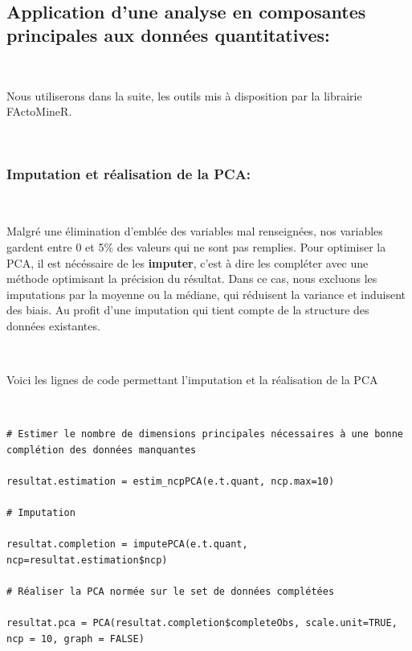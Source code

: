 \documentclass[]{imsart}
\numberwithin{equation}{section}
\theoremstyle{plain}
\begin{document}
~

\hypertarget{application-dune-analyse-en-composantes-principales-aux-donnuxe9es-quantitatives}{%
\subsection{Application d'une analyse en composantes principales aux données quantitatives:}\label{application-dune-analyse-en-composantes-principales-aux-donnuxe9es-quantitatives}}

~

Nous utiliserons dans la suite, les outils mis à disposition par la librairie FActoMineR.

~

\hypertarget{imputation-et-ruxe9alisation-de-la-pca}{%
\subsubsection{Imputation et réalisation de la PCA:}\label{imputation-et-ruxe9alisation-de-la-pca}}

~

Malgré une élimination d'emblée des variables mal renseignées, nos variables gardent entre 0 et 5\% des valeurs qui ne sont pas remplies. Pour optimiser la PCA, il est nécéssaire de les \textbf{imputer}, c'est à dire les compléter avec une méthode optimisant la précision du résultat. Dans ce cas, nous excluons les imputations par la moyenne ou la médiane, qui réduisent la variance et induisent des biais. Au profit d'une imputation qui tient compte de la structure des données existantes.

~

Voici les lignes de code permettant l'imputation et la réalisation de la PCA

~

\begin{verbatim}
# Estimer le nombre de dimensions principales nécessaires à une bonne complétion des données manquantes

resultat.estimation = estim_ncpPCA(e.t.quant, ncp.max=10) 

# Imputation

resultat.completion = imputePCA(e.t.quant, ncp=resultat.estimation$ncp) 

# Réaliser la PCA normée sur le set de données complétées

resultat.pca = PCA(resultat.completion$completeObs, scale.unit=TRUE, ncp = 10, graph = FALSE) 
\end{verbatim}
\end{document}
